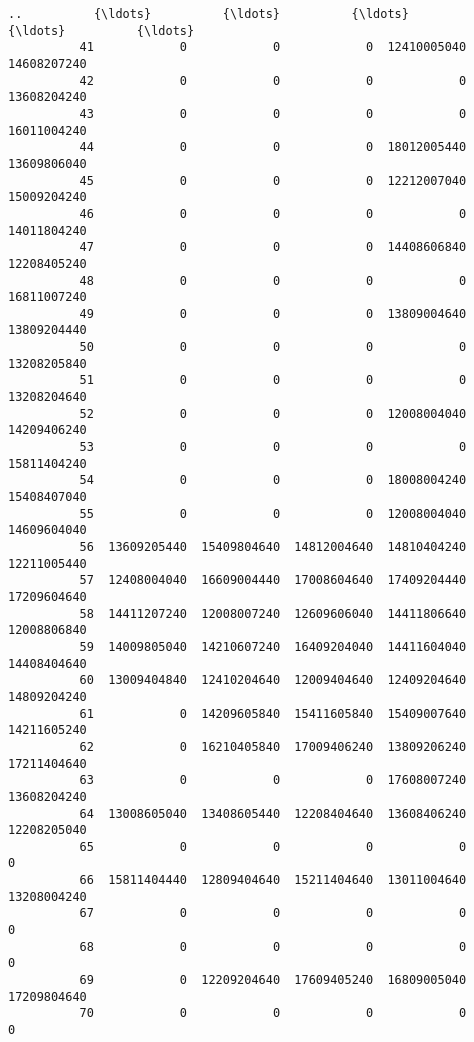 \documentclass[11pt]{article}
\begin{document}
\begin{Verbatim}[commandchars=\\\{\}]
          ..          {\ldots}          {\ldots}          {\ldots}          {\ldots}          {\ldots}   
          41            0            0            0  12410005040  14608207240   
          42            0            0            0            0  13608204240   
          43            0            0            0            0  16011004240   
          44            0            0            0  18012005440  13609806040   
          45            0            0            0  12212007040  15009204240   
          46            0            0            0            0  14011804240   
          47            0            0            0  14408606840  12208405240   
          48            0            0            0            0  16811007240   
          49            0            0            0  13809004640  13809204440   
          50            0            0            0            0  13208205840   
          51            0            0            0            0  13208204640   
          52            0            0            0  12008004040  14209406240   
          53            0            0            0            0  15811404240   
          54            0            0            0  18008004240  15408407040   
          55            0            0            0  12008004040  14609604040   
          56  13609205440  15409804640  14812004640  14810404240  12211005440   
          57  12408004040  16609004440  17008604640  17409204440  17209604640   
          58  14411207240  12008007240  12609606040  14411806640  12008806840   
          59  14009805040  14210607240  16409204040  14411604040  14408404640   
          60  13009404840  12410204640  12009404640  12409204640  14809204240   
          61            0  14209605840  15411605840  15409007640  14211605240   
          62            0  16210405840  17009406240  13809206240  17211404640   
          63            0            0            0  17608007240  13608204240   
          64  13008605040  13408605440  12208404640  13608406240  12208205040   
          65            0            0            0            0            0   
          66  15811404440  12809404640  15211404640  13011004640  13208004240   
          67            0            0            0            0            0   
          68            0            0            0            0            0   
          69            0  12209204640  17609405240  16809005040  17209804640   
          70            0            0            0            0            0   
          

\end{Verbatim}
\end{document}
